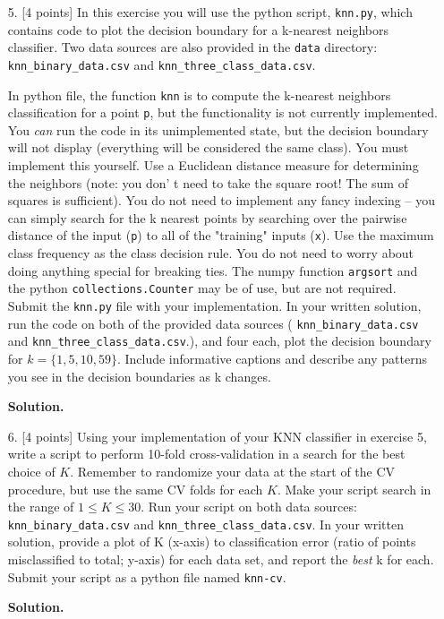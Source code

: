 \documentclass[10pt]{article}
\begin{document}
\begin{itemize}
{\bf Solution.}




\item[5.]  [4 points]
In this exercise you will use the python script, {\tt knn.py}, which contains code to plot the decision boundary for a k-nearest neighbors classifier.  Two data sources are also provided in the {\tt data} directory: {\tt knn\_binary\_data.csv} and {\tt knn\_three\_class\_data.csv}.

In python file, the function {\tt knn} is to compute the k-nearest neighbors classification for a point {\tt p}, but the functionality is not currently implemented.  You \emph{can} run the code in its unimplemented state, but the decision boundary will not display (everything will be considered the same class).  You must implement this yourself.  Use a Euclidean distance measure for determining the neighbors (note: you don' t need to take the square root! The sum of squares is sufficient).  You do not need to implement any fancy indexing -- you can simply search for the k nearest points by searching over the pairwise distance of the input ({\tt p}) to all of the "training" inputs ({\tt x}).  Use the maximum class frequency as the class decision rule.  You do not need to worry about doing anything special for breaking ties.  The numpy function {\tt argsort} and the python {\tt collections.Counter} may be of use, but are not required.  Submit the {\tt knn.py} file with your implementation.  In your written solution, run the code on both of the provided data sources ( {\tt knn\_binary\_data.csv} and {\tt knn\_three\_class\_data.csv}.), and four each, plot the decision boundary for $k = \{1, 5, 10, 59\}$.  Include informative captions and describe any patterns you see in the decision boundaries as k changes.

{\bf Solution.}




\item[6.]  [4 points]
Using your implementation of your KNN classifier in exercise 5, write a script to perform 10-fold cross-validation in a search for the best choice of $K$.  Remember to randomize your data at the start of the CV procedure, but use the same CV folds for each $K$.  Make your script search in the range of $1 \leq K \leq 30$.  Run your script on both data sources: {\tt knn\_binary\_data.csv} and {\tt knn\_three\_class\_data.csv}.  In your written solution, provide a plot of K (x-axis) to classification error (ratio of points misclassified to total; y-axis) for each data set, and report the \emph{best} k for each.  Submit your script as a python file named {\tt knn-cv}.

{\bf Solution.}



\end{itemize}
\end{document}
